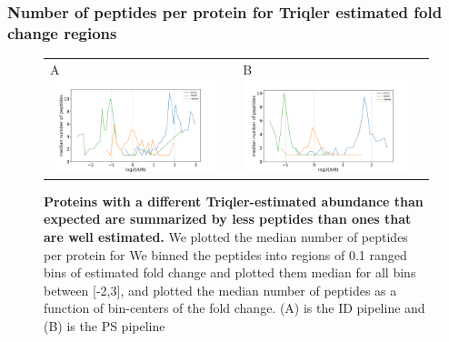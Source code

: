 \documentclass[11pt]{article}
\begin{document}
\subsubsection*{Number of peptides per protein for Triqler estimated fold change regions}
\begin{figure}[hbt]
    \centering
    \centering
    \begin{tabular}{lclc} 
        A \includegraphics[width=0.5\linewidth]{../../result/report_plots_pipeline/fc_peptide_count_ID_triqler.png} & &
        B \includegraphics[width=0.5\linewidth]{../../result/report_plots_pipeline/fc_peptide_count_PS_triqler.png} & \\
    \end{tabular}
    \caption{{\bf Proteins with a different Triqler-estimated abundance than expected are summarized by less peptides than ones that are well estimated.} We plotted the median number of peptides per protein for    
  We binned the peptides into regions of 0.1 ranged bins of estimated fold change and plotted them median for all bins between [-2,3], and plotted the median number of peptides as a function of bin-centers of the fold change. (A) is the ID pipeline and (B) is the PS pipeline \label{fig:number_of_peptides_supplement}}
\end{figure}
\end{document}
